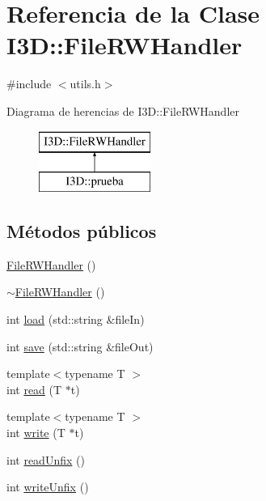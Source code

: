\hypertarget{class_i3_d_1_1_file_r_w_handler}{}\section{Referencia de la Clase I3D\+:\+:File\+R\+W\+Handler}
\label{class_i3_d_1_1_file_r_w_handler}


{\ttfamily \#include $<$utils.\+h$>$}

Diagrama de herencias de I3D\+:\+:File\+R\+W\+Handler\begin{figure}[H]
\begin{center}
\leavevmode
\includegraphics[height=2.000000cm]{class_i3_d_1_1_file_r_w_handler}
\end{center}
\end{figure}
\subsection*{Métodos públicos}
\begin{DoxyCompactItemize}
\item 
\hyperlink{class_i3_d_1_1_file_r_w_handler_a3f98e445bb53726d97f468bf7388879a}{File\+R\+W\+Handler} ()
\item 
\hyperlink{class_i3_d_1_1_file_r_w_handler_ac306265dbf97cb229fb3dd7edc1f6de6}{$\sim$\+File\+R\+W\+Handler} ()
\item 
int \hyperlink{class_i3_d_1_1_file_r_w_handler_ae7e22b09cc291c37e1beace9d1d0e364}{load} (std\+::string \&file\+In)
\item 
int \hyperlink{class_i3_d_1_1_file_r_w_handler_aeec728274a30a1da8ddf455289fee76f}{save} (std\+::string \&file\+Out)
\item 
{\footnotesize template$<$typename T $>$ }\\int \hyperlink{class_i3_d_1_1_file_r_w_handler_a4e5878a16ead0791b55e5f6ffa9facf8}{read} (T $\ast$t)
\item 
{\footnotesize template$<$typename T $>$ }\\int \hyperlink{class_i3_d_1_1_file_r_w_handler_a39f22e7b8c40ee20f41a4888df8fadfb}{write} (T $\ast$t)
\item 
int \hyperlink{class_i3_d_1_1_file_r_w_handler_a7ca9ab3ca98736ccf534bdbc42bb32d9}{read\+Unfix} ()
\item 
int \hyperlink{class_i3_d_1_1_file_r_w_handler_afcb08e482ed5c2996acae08bfab9de40}{write\+Unfix} ()
\end{DoxyCompactItemize}


